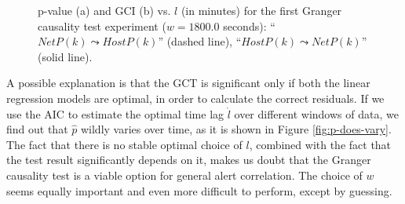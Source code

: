 \begin{figure}[p]
  \caption{p-value (a) and \ac{GCI} (b) vs. $l$ (in
    minutes) for the first Granger causality test experiment ($w =
    1800.0$ seconds): ``$NetP(k) \leadsto HostP(k)$'' (dashed line),
    ``$HostP(k) \leadsto NetP(k)$'' (solid line).}
  \label{fig:hh_a0}
\end{figure}

A possible explanation is that the \ac{GCT} is significant only if both the linear regression models are optimal, in order to calculate the correct residuals. If we use the \ac{AIC} \citep{akaike1974nls} to estimate the optimal time lag $\hat{l}$ over different windows of data, we find out that $\hat{p}$ wildly varies over time, as it is shown in Figure \ref{fig:p-does-vary}. The fact that there is no stable optimal choice of $l$, combined with the fact that the test result significantly depends on it, makes us doubt that the Granger causality test is a viable option for general alert correlation. The choice of $w$ seems equally important and even more difficult to perform, except by guessing.

